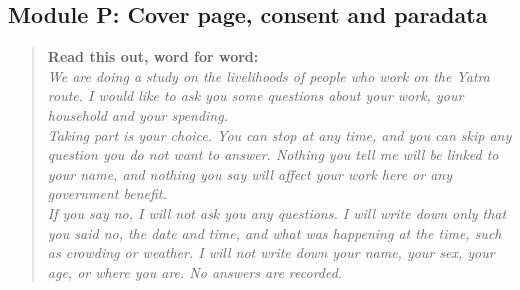 \documentclass[10pt]{article}
\begin{document}
\subsection*{Module P: Cover page, consent and paradata}
\begin{quote}\small\textbf{Read this out, word for word:}\\[4pt]
\textit{We are doing a study on the livelihoods of people who work on the Yatra route. I would like to ask you some questions about your work, your household and your spending.\\[6pt]Taking part is your choice. You can stop at any time, and you can skip any question you do not want to answer. Nothing you tell me will be linked to your name, and nothing you say will affect your work here or any government benefit.\\[6pt]If you say no, I will not ask you any questions. I will write down only that you said no, the date and time, and what was happening at the time, such as crowding or weather. I will not write down your name, your sex, your age, or where you are. No answers are recorded.}\end{quote}
\end{document}
